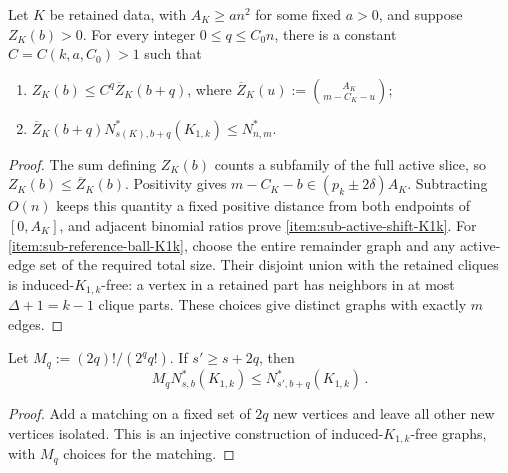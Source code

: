 \begin{lemma}\label{lemma:sub-combined}
Let $K$ be retained data, with $A_K\geq a n^2$ for some fixed $a>0$, and suppose $Z_K(b)>0$. For every integer $0\leq q\leq C_0n$, there is a constant $C=C(k,a,C_0)>1$ such that
\begin{enumerate}[label=\textit{(\roman*)}, ref=(\textit{\roman*}), topsep=5pt]
\item\label{item:sub-active-shift-K1k} $Z_K(b)\leq C^q\overline Z_K(b+q)$, where $\overline Z_K(u):=\binom{A_K}{m-C_K-u}$;
\item\label{item:sub-reference-ball-K1k} $\overline Z_K(b+q)N^\ast_{s(K),b+q}(K_{1,k})\leq N^\ast_{n,m}$.
\end{enumerate}
\end{lemma}
\begin{proof}
The sum defining $Z_K(b)$ counts a subfamily of the full active slice, so $Z_K(b)\leq\overline Z_K(b)$. Positivity gives $m-C_K-b\in(p_k\pm2\delta)A_K$. Subtracting $O(n)$ keeps this quantity a fixed positive distance from both endpoints of $[0,A_K]$, and adjacent binomial ratios prove \ref{item:sub-active-shift-K1k}. For \ref{item:sub-reference-ball-K1k}, choose the entire remainder graph and any active-edge set of the required total size. Their disjoint union with the retained cliques is induced-$K_{1,k}$-free: a vertex in a retained part has neighbors in at most $\Delta+1=k-1$ clique parts. These choices give distinct graphs with exactly $m$ edges.
\end{proof}

\begin{lemma}\label{lemma:sub-sparse-matching-transfer-K1k}
Let $M_q:=(2q)!/(2^qq!)$. If $s'\geq s+2q$, then
$$M_qN^\ast_{s,b}(K_{1,k})\leq N^\ast_{s',b+q}(K_{1,k})\,.$$
\end{lemma}
\begin{proof}
Add a matching on a fixed set of $2q$ new vertices and leave all other new vertices isolated. This is an injective construction of induced-$K_{1,k}$-free graphs, with $M_q$ choices for the matching.
\end{proof}

